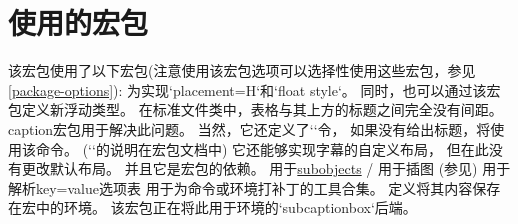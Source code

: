 
\section{使用的宏包}
\label{used-packages}

该宏包使用了以下宏包(注意使用该宏包选项可以选择性使用这些宏包，参见\cref{package-options}):
  为实现`placement=H`和`float style`。
  同时，也可以通过该宏包定义新浮动类型。
  在标准文件类中，表格与其上方的标题之间完全没有间距。
  caption宏包用于解决此问题。
  当然，它还定义了``令，
  如果没有给出标题，将使用该命令。
  (``的说明在宏包文档中)
  它还能够实现字幕的自定义布局，
  但在此没有更改默认布局。
  并且它是宏包的依赖。
  用于\hyperref[subobject-environment]{subobjects}
/
  用于插图
  (参见)
  用于解析key=value选项表
  用于为命令或环境打补丁的工具合集。
  定义将其内容保存在宏中的环境。
  该宏包正在将此用于环境的`subcaptionbox`后端。
\endpkgdoc
